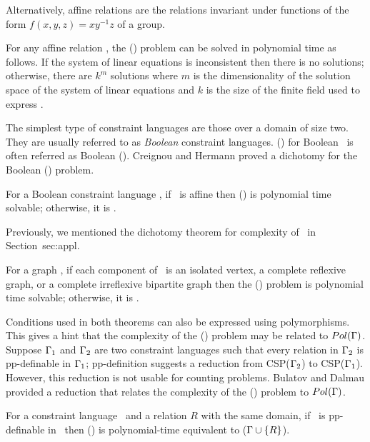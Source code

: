 Alternatively, affine relations are the relations invariant under functions of the form
\(f(x,y,z)=xy^{-1}z\) of a group.

For any affine relation \mR, the \ccsp(\mR) problem can be solved in polynomial time
as follows. If the system of linear equations is inconsistent
then there is no solutions; otherwise, there are \(k^m\) solutions where \(m\) is the
dimensionality of the solution space of the system of linear equations and
\(k\) is the size of the finite field used to express \mR\@.

The simplest type of constraint languages are those 
over a domain of size two. They are usually 
referred to as \emph{Boolean} constraint languages.
\ccsp(\mrelset) for Boolean \mrelset\ is often referred as Boolean \ccsp(\mrelset)\@.
Creignou and Hermann proved a dichotomy for the Boolean \ccsp(\mrelset) problem.

\begin{theorem}  
For a Boolean constraint language \mrelset,
if  \mrelset\ is affine then \ccsp(\mrelset) 
is polynomial time solvable; otherwise, it is \cpc\@.
\end{theorem}

Previously, we mentioned the dichotomy theorem for complexity of \ccsp\ in  Section~{sec:appl}.

\begin{theorem} 
For a graph \mH, if each component of \mH\ is an isolated vertex, a complete reflexive graph,
or a complete irreflexive bipartite graph then the \chom(\mH) problem 
is polynomial time solvable; otherwise, it is \cpc\@.
\end{theorem}

Conditions used in both theorems can also be expressed using polymorphisms. This gives a hint
that the complexity of the \ccsp(\mrelset) problem may be related to \(Pol(\Gamma)\)\@.
Suppose  \(\Gamma_1\) and \(\Gamma_2\) are two constraint languages such that
every relation in \(\Gamma_2\) is pp-definable in \(\Gamma_1\); 
pp-definition suggests a reduction from CSP(\(\Gamma_2\))
to CSP(\(\Gamma_1\))\@. However, this reduction is not usable for counting problems. 
Bulatov and Dalmau provided a reduction that relates 
the complexity of the \ccsp(\mrelset) problem to \(Pol(\Gamma)\)\@.

\begin{theorem} 
For a constraint language \mrelset\ and a relation \(R\) with the same domain,
if \mR\ is pp-definable in \mrelset\ then \ccsp(\mrelset) is polynomial-time equivalent 
to \ccsp(\(\Gamma \cup \{{R}\}\))\@.
\end{theorem}

